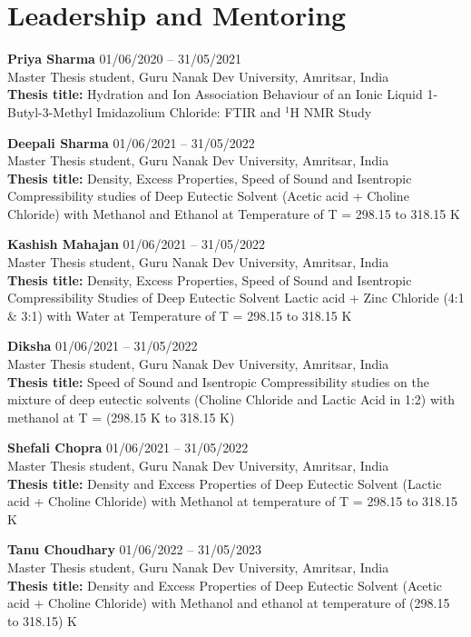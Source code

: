 \documentclass[11pt,a4paper]{article}
\begin{document}
\vspace{0.6cm}

\section*{Leadership and Mentoring}

\textbf{Priya Sharma} \hfill 01/06/2020 -- 31/05/2021\\
Master Thesis student, Guru Nanak Dev University, Amritsar, India\\
\textbf{Thesis title:} Hydration and Ion Association Behaviour of an Ionic Liquid 1-Butyl-3-Methyl Imidazolium Chloride: FTIR and $^1$H NMR Study

\textbf{Deepali Sharma} \hfill 01/06/2021 -- 31/05/2022\\
Master Thesis student, Guru Nanak Dev University, Amritsar, India\\
\textbf{Thesis title:} Density, Excess Properties, Speed of Sound and Isentropic Compressibility studies of Deep Eutectic Solvent (Acetic acid + Choline Chloride) with Methanol and Ethanol at Temperature of T = 298.15 to 318.15 K

\textbf{Kashish Mahajan} \hfill 01/06/2021 -- 31/05/2022\\
Master Thesis student, Guru Nanak Dev University, Amritsar, India\\
\textbf{Thesis title:} Density, Excess Properties, Speed of Sound and Isentropic Compressibility Studies of Deep Eutectic Solvent Lactic acid + Zinc Chloride (4:1 \& 3:1) with Water at Temperature of T = 298.15 to 318.15 K

\textbf{Diksha} \hfill 01/06/2021 -- 31/05/2022\\
Master Thesis student, Guru Nanak Dev University, Amritsar, India\\
\textbf{Thesis title:} Speed of Sound and Isentropic Compressibility studies on the mixture of deep eutectic solvents (Choline Chloride and Lactic Acid in 1:2) with methanol at T = (298.15 K to 318.15 K)

\textbf{Shefali Chopra} \hfill 01/06/2021 -- 31/05/2022\\
Master Thesis student, Guru Nanak Dev University, Amritsar, India\\
\textbf{Thesis title:} Density and Excess Properties of Deep Eutectic Solvent (Lactic acid + Choline Chloride) with Methanol at temperature of T = 298.15 to 318.15 K

\textbf{Tanu Choudhary} \hfill 01/06/2022 -- 31/05/2023\\
Master Thesis student, Guru Nanak Dev University, Amritsar, India\\
\textbf{Thesis title:} Density and Excess Properties of Deep Eutectic Solvent (Acetic acid + Choline Chloride) with Methanol and ethanol at temperature of (298.15 to 318.15) K
\end{document}
